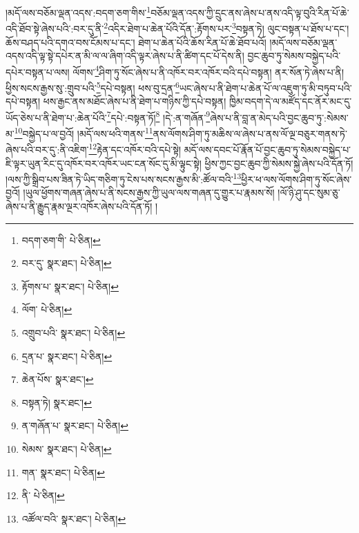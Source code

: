 །མདོ་ལས་བཅོམ་ལྡན་འདས་:བདག་ཅག་གིས་\footnote{བདག་ཅག་གི་  པེ་ཅིན། }བཅོམ་ལྡན་འདས་ཀྱི་དྲུང་ནས་ཞེས་པ་ནས་འདི་ལྟ་བུའི་རིན་པོ་ཆེ་འདི་ཐོབ་སྟེ་ཞེས་པའི་:བར་དུ་ནི་\footnote{བར་དུ་  སྣར་ཐང་།  པེ་ཅིན། }འདིར་ཐེག་པ་ཆེན་པོའི་དོན་:རྟོགས་པར་\footnote{རྟོགས་པ་  སྣར་ཐང་།  པེ་ཅིན། }བསྟན་ཏེ། ལུང་བསྟན་པ་ཐོས་པ་དང་། ཆོས་བཤད་པའི་དགའ་བས་ངོམས་པ་དང་། ཐེག་པ་ཆེན་པོའི་ཆོས་རིན་པོ་ཆེ་ཐོབ་པའོ། །མདོ་ལས་བཅོམ་ལྡན་འདས་འདི་ལྟ་སྟེ་དཔེར་ན་མི་ལ་ལ་ཞིག་འདི་ལྟར་ཞེས་པ་ནི་ཚིག་དང་པོ་དེས་ནི། བྱང་ཆུབ་ཏུ་སེམས་བསྐྱེད་པའི་དཔེར་བསྟན་པ་ལས། ལོགས་\footnote{ལོག་  པེ་ཅིན། }ཤིག་ཏུ་སོང་ཞེས་པ་ནི་འཁོར་བར་འཁོར་བའི་དཔེ་བསྟན། ནར་སོན་ཏེ་ཞེས་པ་ནི། ཕྱིས་སངས་རྒྱས་སུ་:གྲུབ་པའི་\footnote{འགྲུབ་པའི་  སྣར་ཐང་།  པེ་ཅིན། }དཔེ་བསྟན། ཕས་བུ་དྲན་\footnote{དྲན་པ་  སྣར་ཐང་།  པེ་ཅིན། }ཡང་ཞེས་པ་ནི་ཐེག་པ་ཆེན་པོ་ལ་འཇུག་ཏུ་མི་བཏུབ་པའི་དཔེ་བསྟན། ཕས་རྒྱང་ནས་མཐོང་ཞེས་པ་ནི་ཐེག་པ་གཉིས་ཀྱི་དཔེ་བསྟན། ཁྱིམ་བདག་དེ་ལ་མཛོད་དང་ནོར་མང་དུ་ཡོད་ཅེས་པ་ནི་ཐེག་པ་:ཆེན་པོའི་\footnote{ཆེན་པོས་  སྣར་ཐང་། }དཔེ་:བསྟན་ཏོ།\footnote{བསྟན་ཏེ།  སྣར་ཐང་། } །དེ་:ན་གཞོན་\footnote{ན་གཞོན་པ་  སྣར་ཐང་།  པེ་ཅིན། }ཞེས་པ་ནི་བླ་ན་མེད་པའི་བྱང་ཆུབ་ཏུ་:སེམས་མ་\footnote{སེམས་  སྣར་ཐང་།  པེ་ཅིན། }བསྐྱེད་པ་ལ་བྱའོ། །མདོ་ལས་ཕའི་གནས་\footnote{གན་  སྣར་ཐང་།  པེ་ཅིན། }ནས་ལོགས་ཤིག་ཏུ་མཆིས་ལ་ཞེས་པ་ནས་ལོ་ལྔ་བཅུར་གནས་ཏེ་ཞེས་པའི་བར་དུ་:ནི་འཇིག་\footnote{ནི་  པེ་ཅིན། }རྟེན་དང་འཁོར་བའི་དཔེ་སྟེ། མདོ་ལས་དབང་པོ་རྣོན་པོ་བྱང་ཆུབ་ཏུ་སེམས་བསྐྱེད་པ་ཇི་ལྟར་ཡུན་རིང་དུ་འཁོར་བར་འཁོར་ཡང་ངན་སོང་དུ་མི་ལྟུང་སྟེ། ཕྱིས་ཀྱང་བྱང་ཆུབ་ཀྱི་སེམས་སྐྱེ་ཞེས་པའི་དོན་ཏོ། །ལས་ཀྱི་སྒྲིབ་པས་ཟིན་ཏེ་ཡིད་གཅིག་ཏུ་ངེས་པས་སངས་རྒྱས་མི་:ཚོལ་བའི་\footnote{འཚོལ་བའི་  སྣར་ཐང་།  པེ་ཅིན། }ཕྱིར་ཕ་ལས་ལོགས་ཤིག་ཏུ་སོང་ཞེས་བྱའོ། །ཡུལ་ཕྱོགས་གཞན་ཞེས་པ་ནི་སངས་རྒྱས་ཀྱི་ཡུལ་ལས་གཞན་དུ་གྱུར་པ་རྣམས་སོ། །ལོ་ཉི་ཤུ་དང་སུམ་ཅུ་ཞེས་པ་ནི་རྒྱུད་རྣམ་ལྔར་འཁོར་ཞེས་པའི་དོན་ཏོ། །
